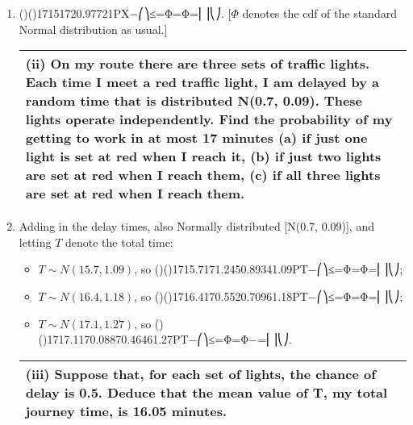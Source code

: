 \documentclass[a4paper,12pt]{article}
\begin{document}
\begin{enumerate}
\item ()()17151720.97721PX−⎛⎞≤=Φ=Φ=⎜⎟⎝⎠.
[$\Phi$ denotes the cdf of the standard Normal distribution as usual.]

\newpage
\begin{table}[ht!]
     \centering
     \begin{tabular}{|p{15cm}|}
     \hline        
\noindent (ii) On my route there are three sets of traffic lights. Each time I meet a red traffic light, I am delayed by a random time that is distributed N(0.7, 0.09). These lights operate independently. Find the probability of my getting to work in at most 17 minutes
(a) if just one light is set at red when I reach it,
(b) if just two lights are set at red when I reach them,
(c) if all three lights are set at red when I reach them.

\\ \hline
      \end{tabular}
    \end{table}
    



\item  Adding in the delay times, also Normally distributed [N(0.7, 0.09)], and letting $T$ denote the total time:
\begin{itemize}
\item $T \sim N(15.7, 1.09)$, so ()()1715.7171.2450.89341.09PT−⎛⎞≤=Φ=Φ=⎜⎟⎝⎠;
\item $T \sim N(16.4, 1.18)$, so ()()1716.4170.5520.70961.18PT−⎛⎞≤=Φ=Φ=⎜⎟⎝⎠;
\item $T \sim N(17.1, 1.27)$, so ()()1717.1170.08870.46461.27PT−⎛⎞≤=Φ=Φ−=⎜⎟⎝⎠.
\end{itemize}

\newpage


\begin{table}[ht!]
     \centering
     \begin{tabular}{|p{15cm}|}
     \hline        
\noindent (iii) Suppose that, for each set of lights, the chance of delay is 0.5. Deduce that the mean value of T, my total journey time, is 16.05 minutes.


\\ \hline
      \end{tabular}
    \end{table}
    

\end{enumerate}
\end{document}
